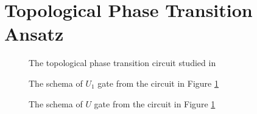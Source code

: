 \section{Topological Phase Transition Ansatz}
\label{apx:topological_phase_transition_ansatz}
\begin{figure}[htbp!]
  \caption{The topological phase transition circuit studied in \cite{smith2020crossing} }
  \label{fig:phase_circuit_apx}
\end{figure}
\begin{figure}[htbp!]
  \caption{The schema of $U_1$ gate from the circuit in Figure \ref{fig:phase_circuit_apx}}
  \label{fig:phase_circuit_u1}
\end{figure}
\begin{figure}[htbp!]
  \caption{The schema of $U$ gate from the circuit in Figure \ref{fig:phase_circuit_apx}}
  \label{fig:phase_circuit_u}
\end{figure}

